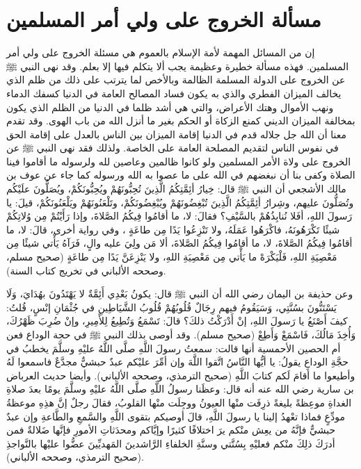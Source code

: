 \section{مسألة الخروج على ولي أمر المسلمين}
\label{sec:app_rebellion}

إن من المسائل المهمة لأمة الإسلام بالعموم هي مسئلة الخروج على ولي أمر المسلمين. فهذه مسألة خطيرة وعظيمة يجب ألا يتكلم فيها إلا بعلم. 
وقد نهى النبي ﷺ عن الخروج على الدولة المسلمة الظالمة وبالأخص لما يترتب على ذلك من ظلم الذي يخالف الميزان الفطري والذي به يكون فساد المصالح العامة في الدنيا كسفك الدماء ونهب الأموال وهتك الأعراض، والتي هي أشد ظلما في الدنيا من الظلم الذي يكون بمخالفة الميزان الديني كمنع الزكاة أو الحكم بغير ما أنزل الله من باب الهوى. وقد تقدم معنا أن الله جل جلاله قدم في الدنيا إقامة الميزان بين الناس بالعدل على إقامة الحق في نفوس الناس لتقديم المصلحة العامة على الخاصة. ولذلك فقد نهى النبي ﷺ عن الخروج على ولاة الأمر المسلمين ولو كانوا ظالمين وعاصين لله ولرسوله  ما أقاموا فينا الصلاة وكفى بنا أن نبغضهم في الله على ما عصوا به الله ورسوله كما جاء عن عوف بن مالك الأشجعي أن النبي ﷺ قال: خِيارُ أئِمَّتِكُمُ الَّذِينَ تُحِبُّونَهُمْ ويُحِبُّونَكُمْ، ويُصَلُّونَ علَيْكُم وتُصَلُّونَ عليهم، وشِرارُ أئِمَّتِكُمُ الَّذِينَ تُبْغِضُونَهُمْ ويُبْغِضُونَكُمْ، وتَلْعَنُونَهُمْ ويَلْعَنُونَكُمْ، قيلَ: يا رَسولَ اللهِ، أفَلا نُنابِذُهُمْ بالسَّيْفِ؟ فقالَ: لا، ما أقامُوا فِيكُمُ الصَّلاةَ، وإذا رَأَيْتُمْ مِن وُلاتِكُمْ شيئًا تَكْرَهُونَهُ، فاكْرَهُوا عَمَلَهُ، ولا تَنْزِعُوا يَدًا مِن طاعَةٍ ، وفي رواية أخرى، قالَ: لا، ما أقامُوا فِيكُمُ الصَّلاةَ، لا، ما أقامُوا فِيكُمُ الصَّلاةَ، ألا مَن ولِيَ عليه والٍ، فَرَآهُ يَأْتي شيئًا مِن مَعْصِيَةِ اللهِ، فَلْيَكْرَهْ ما يَأْتي مِن مَعْصِيَةِ اللهِ، ولا يَنْزِعَنَّ يَدًا مِن طاعَةٍ {\footnotesize (صحيح مسلم، وصححه الألباني في تخريج كتاب السنة)}. 


وعن حذيفة بن اليمان رضي الله أن النبي ﷺ قال: يكونُ بَعْدِي أَئِمَّةٌ لا يَهْتَدُونَ بهُدَايَ، وَلَا يَسْتَنُّونَ بسُنَّتِي، وَسَيَقُومُ فيهم رِجَالٌ قُلُوبُهُمْ قُلُوبُ الشَّيَاطِينِ في جُثْمَانِ إنْسٍ، قُلتُ: كيفَ أَصْنَعُ يا رَسولَ اللهِ، إنْ أَدْرَكْتُ ذلكَ؟ قالَ: تَسْمَعُ وَتُطِيعُ لِلأَمِيرِ، وإنْ ضُرِبَ ظَهْرُكَ، وَأُخِذَ مَالُكَ، فَاسْمَعْ وَأَطِعْ {\footnotesize (صحيح مسلم)}. وقد أوصى بذلك النبي ﷺ في حجة الوداع فعن أم الحصين الأحمسية أنها قالت: سمعتُ رسولَ اللَّهِ صلَّى اللَّهُ عليْهِ وسلَّمَ يخطبُ في حجَّةِ الوداعِ   يقولُ: يا أيُّها النَّاسُ اتَّقوا اللَّهَ وإن أمِّرَ عليْكم عبدٌ حبشيٌّ مجدَّعٌ فاسمعوا لَهُ وأطيعوا ما أقامَ لَكم كتابَ اللَّهِ  {\footnotesize (صحيح الترمذي، وصححه الألباني)}. وأيضا حديث العرباض بن سارية رضي الله عنه أنه قال: وعظَنا رسولُ اللَّهِ صلَّى اللَّهُ عليْهِ وسلَّمَ يومًا بعدَ صلاةِ الغداةِ موعِظةً بليغةً ذرِفَت منْها العيونُ ووجِلَت منْها القلوبُ، فقالَ رجلٌ إنَّ هذِهِ موعظةُ مودِّعٍ فماذا تعْهدُ إلينا يا رسولَ اللَّهِ، قالَ أوصيكم بتقوى اللَّهِ والسَّمعِ والطَّاعةِ وإن عبدٌ حبشيٌّ فإنَّهُ من يعِش منْكم يرَ اختلافًا كثيرًا وإيَّاكم ومحدَثاتِ الأمورِ فإنَّها ضَلالةٌ فمن أدرَكَ ذلِكَ منْكم فعليْهِ بِسُنَّتي وسنَّةِ الخلفاءِ الرَّاشدينَ المَهديِّينَ عضُّوا عليْها بالنَّواجذِ {\footnotesize (صحيح الترمذي، وصححه الألباني)}.


